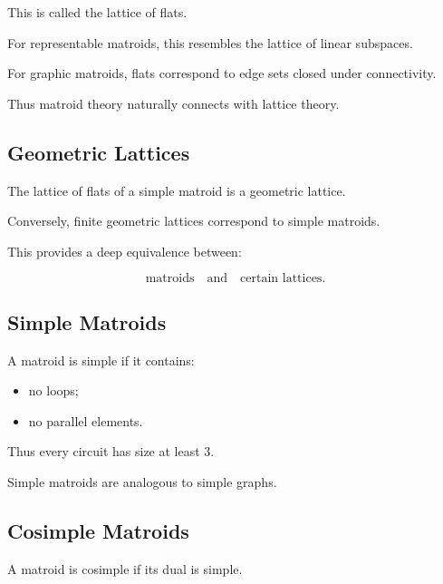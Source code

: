 This is called the lattice of flats.

For representable matroids, this resembles the lattice of linear
subspaces.

For graphic matroids, flats correspond to edge sets closed under
connectivity.

Thus matroid theory naturally connects with lattice theory.

\subsection{Geometric Lattices}
\label{subsec:geometric-lattices}

The lattice of flats of a simple matroid is a geometric lattice.

Conversely, finite geometric lattices correspond to simple matroids.

This provides a deep equivalence between:

\[
\boxed{
\text{matroids}
\quad\text{and}\quad
\text{certain lattices}.
}
\]

\subsection{Simple Matroids}
\label{subsec:simple-matroids}

A matroid is simple if it contains:

\begin{itemize}
    \item no loops;
    \item no parallel elements.
\end{itemize}

Thus every circuit has size at least \(3\).

Simple matroids are analogous to simple graphs.

\subsection{Cosimple Matroids}
\label{subsec:cosimple-matroids}

A matroid is cosimple if its dual is simple.

